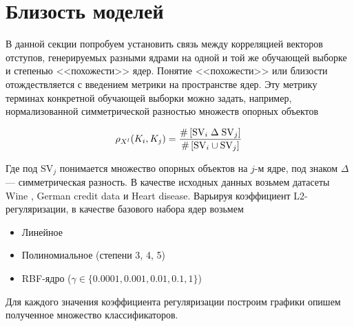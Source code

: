 \documentclass[12pt,twoside]{article}
\begin{document}
%
%
%



\section{Близость моделей}

В данной секции попробуем установить связь между корреляцией векторов отступов,
генерируемых
разными ядрами на одной и той же обучающей выборке и степенью <<похожести>>
ядер. Понятие <<похожести>> или близости отождествляется с введением метрики
на пространстве ядер. Эту метрику терминах конкретной обучающей выборки можно
задать, например, нормализованной симметрической разностью множеств опорных объектов

$$
\rho_{X^l}(K_i, K_j) = \frac{\#\left[\mathrm{SV}_i \;\Delta\; \mathrm{SV}_j\right]}
{\#\left[\mathrm{SV}_i \cup \mathrm{SV}_j\right]}
$$

Где под $\mathrm{SV}_j$ понимается множество опорных объектов на $j$-м ядре, под
знаком $\Delta$ --- симметрическая разность. В качестве исходных данных
возьмем датасеты Wine \cite{UCI:Wine}, German credit data\cite{UCI:German} и
Heart disease\cite{UCI:Heart}. Варьируя коэффициент L2-регуляризации, в качестве базового набора ядер возьмем

\begin{itemize}
    \item Линейное
    \item Полиномиальное (степени 3, 4, 5)
    \item RBF-ядро ($\gamma \in \{0.0001, 0.001, 0.01, 0.1, 1\}$)
\end{itemize}

Для каждого значения коэффициента регуляризации построим графики
опишем полученное множество классификаторов.
\end{document}
